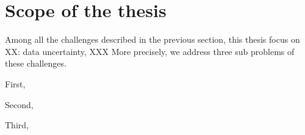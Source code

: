 \section{Scope of the thesis}

Among all the challenges described in the previous section, this thesis focus on XX: data uncertainty, XXX
More precisely, we address three sub problems of these challenges.

First,

Second,

Third,

